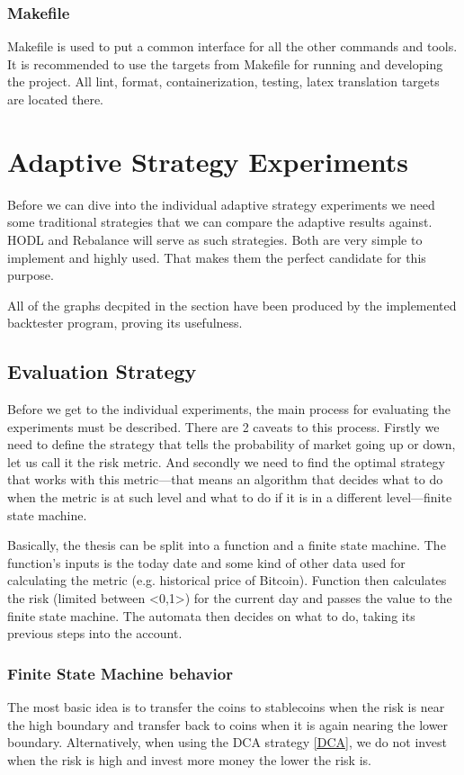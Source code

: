 \subsection*{Makefile}
Makefile is used to put a common interface for all the other commands and tools. It is recommended to use the targets from Makefile for running and developing the project. All lint, format, containerization, testing, latex translation targets are located there.

\chapter{Adaptive Strategy Experiments}
\label{chapter-experiments}

Before we can dive into the individual adaptive strategy experiments we need some traditional strategies that we can compare the adaptive results against. HODL and Rebalance will serve as such strategies. Both are very simple to implement and highly used. That makes them the perfect candidate for this purpose.

All of the graphs decpited in the section have been produced by the implemented backtester program, proving its usefulness.

\section{Evaluation Strategy}
Before we get to the individual experiments, the main process for evaluating the experiments must be described. There are 2 caveats to this process. Firstly we need to define the strategy that tells the probability of market going up or down, let us call it the risk metric. And secondly we need to find the optimal strategy that works with this metric---that means an algorithm that decides what to do when the metric is at such level and what to do if it is in a different level---finite state machine.

Basically, the thesis can be split into a function and a finite state machine. The function's inputs is the today date and some kind of other data used for calculating the metric (e.g. historical price of Bitcoin). Function then calculates the risk (limited between <0,1>) for the current day and passes the value to the finite state machine. The automata then decides on what to do, taking its previous steps into the account.

\subsection*{Finite State Machine behavior}
The most basic idea is to transfer the coins to stablecoins when the risk is near the high boundary and transfer back to coins when it is again nearing the lower boundary. Alternatively, when using the DCA strategy \ref{DCA}, we do not invest when the risk is high and invest more money the lower the risk is.

